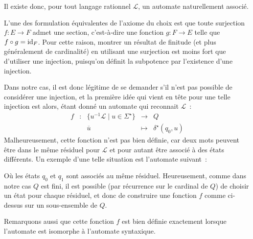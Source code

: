 Il existe donc, pour tout langage rationnel $\mathcal L$, un automate
naturellement associé.

\begin{remark}
  L'une des formulation équivalentes de l'axiome du choix est que toute
  surjection $f : E \to F$ admet une section, c'est-à-dire une fonction
  $g : F \to E$ telle que $f\circ g = \operatorname{id}_F$. Pour cette raison, montrer un
  résultat de finitude (et plus généralement de cardinalité) en utilisant une
  surjection est moins fort que d'utiliser une injection, puisqu'on définit
  la subpotence par l'existence d'une injection.

  Dans notre cas, il est donc légitime de se demander s'il n'est pas possible
  de considérer une injection, et la première idée qui vient en tête pour une
  telle injection est alors, étant donné un automate qui reconnait
  $\mathcal L$~:
  \[\begin{array}{ccccc}
  f & : & \{u^{-1}\mathcal L\mid u \in \Sigma^\star\} & \longrightarrow &
  Q \\
  & & \overline u & \longmapsto & \delta^\star (q_0,u)
  \end{array}\]
  Malheureusement, cette fonction n'est pas bien définie, car deux mots peuvent
  être dans le même résiduel pour $\mathcal L$ et pour autant être associé à
  des états différents. Un exemple d'une telle situation est l'automate
  suivant~:
  
  \begin{figure}[H]
    \centering
  \end{figure}
  Où les états $q_0$ et $q_1$ sont associés au même résiduel. Heureusement,
  comme dans notre cas $Q$ est fini, il est possible (par récurrence sur le
  cardinal de $Q$) de choisir un état pour chaque résiduel, et donc de
  construire une fonction $f$ comme ci-dessus sur un sous-ensemble de $Q$.

  Remarquons aussi que cette fonction $f$ est bien définie exactement lorsque
  l'automate est isomorphe à l'automate syntaxique.
\end{remark}

